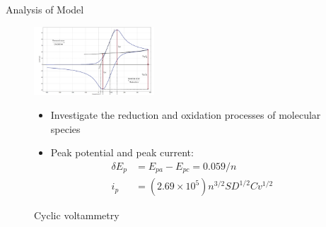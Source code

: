 \documentclass[fontsize=11pt,aspectratio=169,t,fleqn]{beamer}
\begin{document}
\begin{frame}{Analysis of Model}
  \begin{figure}[h!]
    \includegraphics[width=0.4\textwidth,scale=.2]{fig/CV.png}
    \caption{Cyclic voltammetry}
    \begin{itemize}
      \item  Investigate the reduction and oxidation processes of molecular species
      \item  Peak potential and peak current:  \begin{align}
        \delta E_p &= E_{pa}-E_{pc} =0.059/n\\   
        i_p &=(2.69 \times 10^5)n^{3/2}SD^{1/2}Cv^{1/2}  \label{i_p}
        \end{align}
    \end{itemize}
\end{figure}
\end{frame}
\end{document}
